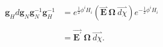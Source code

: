 \begin{equation}
\begin{aligned}
\mathbf{g}_{H}d\mathbf{g}_{N}\mathbf{g}_{N}^{-1}\mathbf{g}_{H}^{-1}&=%
e^{\frac{1}{2}\phi ^{i}H_{i}}(\overset{\rightharpoonup }{\mathbf{E}}%
\:\mathbf{\Omega }\:\overset{\rightharpoonup }{d\chi })e^{-\frac{1%
}{2}\phi ^{i}H_{i}}\\
\\
&=\overset{\rightharpoonup }{
\mathbf{E}^{\prime }}\:\mathbf{\Omega }\:\overset{\rightharpoonup }{d\chi
}.
\end{aligned}
\end{equation}

